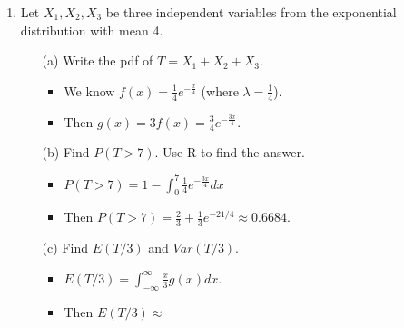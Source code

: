\documentclass{article}
\begin{document}
\begin{enumerate}
\item Let  $X_1,X_2, X_3$ be three independent variables from the exponential distribution with mean 4.
    \begin{itemize}
    \item [(a)] Write the pdf of $T=X_1+X_2+X_3$.
        \begin{itemize}
        \item We know $f(x) = \frac{1}{4} e^{-\frac{x}{4}}$ (where $\lambda = \frac{1}{4}$).
        \item Then $g(x) = 3f(x) = \frac{3}{4} e^{-\frac{3x}{4}}$.
        \end{itemize}
    \item [(b)] Find $P(T>7)$. Use R to find the answer.
        \begin{itemize}
        \item $P(T > 7) = 1 - \int_0^7 \frac{1}{4} e^{-\frac{3x}{4}} dx$
        \item Then $P(T > 7) = \frac{2}{3} + \frac{1}{3} e^{-21/4} \approx 0.6684$.
        \end{itemize}
    \item [(c)] Find $E(T/3)$ and $Var(T/3)$.
        \begin{itemize}
        \item $E(T/3) = \int_{-\infty}^{\infty} \frac{x}{3} g(x) dx$.
        \item Then $E(T/3) \approx$
        \end{itemize}
    \end{itemize}


\end{enumerate}
\end{document}
